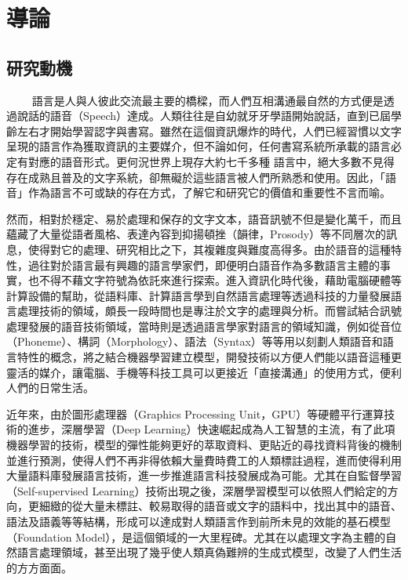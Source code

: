\chapter{導論}

\section{研究動機}
　　
語言是人與人彼此交流最主要的橋樑，而人們互相溝通最自然的方式便是透過說話的語音（Speech）達成。人類往往是自幼就牙牙學語開始說話，直到已屆學齡左右才開始學習認字與書寫。雖然在這個資訊爆炸的時代，人們已經習慣以文字呈現的語言作為獲取資訊的主要媒介，但不論如何，任何書寫系統所承載的語言必定有對應的語音形式。更何況世界上現存大約七千多種 \cite{eberhard_ethnologue_2024} 語言中，絕大多數不見得存在成熟且普及的文字系統，卻無礙於這些語言被人們所熟悉和使用。因此，「語音」作為語言不可或缺的存在方式，了解它和研究它的價值和重要性不言而喻。

然而，相對於穩定、易於處理和保存的文字文本，語音訊號不但是變化萬千，而且蘊藏了大量從語者風格、表達內容到抑揚頓挫（韻律，Prosody）等不同層次的訊息，使得對它的處理、研究相比之下，其複雜度與難度高得多。由於語音的這種特性，過往對於語言最有興趣的語言學家們，即便明白語音作為多數語言主體的事實，也不得不藉文字符號為依託來進行探索。進入資訊化時代後，藉助電腦硬體等計算設備的幫助，從語料庫、計算語言學到自然語言處理等透過科技的力量發展語言處理技術的領域，頗長一段時間也是專注於文字的處理與分析。而嘗試結合訊號處理發展的語音技術領域，當時則是透過語言學家對語言的領域知識，例如從音位（Phoneme）、構詞（Morphology）、語法（Syntax）等等用以刻劃人類語音和語言特性的概念，將之結合機器學習建立模型，開發技術以方便人們能以語音這種更靈活的媒介，讓電腦、手機等科技工具可以更接近「直接溝通」的使用方式，便利人們的日常生活。

近年來，由於圖形處理器（Graphics Processing Unit，GPU）等硬體平行運算技術的進步，深層學習（Deep Learning）快速崛起成為人工智慧的主流，有了此項機器學習的技術，模型的彈性能夠更好的萃取資料、更貼近的尋找資料背後的機制並進行預測，使得人們不再非得依賴大量費時費工的人類標註過程，進而使得利用大量語料庫發展語言技術，進一步推進語言科技發展成為可能。尤其在自監督學習（Self-supervised Learning）技術出現之後，深層學習模型可以依照人們給定的方向，更細緻的從大量未標註、較易取得的語音或文字的語料中，找出其中的語音、語法及語義等等結構，形成可以達成對人類語言作到前所未見的效能的基石模型（Foundation Model），是這個領域的一大里程碑。尤其在以處理文字為主體的自然語言處理領域，甚至出現了幾乎使人類真偽難辨的生成式模型，改變了人們生活的方方面面。

